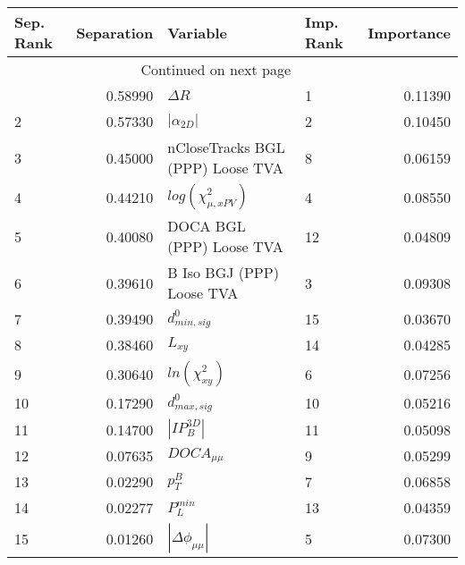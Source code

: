 \usepackage{lscape}

\begin{landscape}
\begin{longtable}{lrllr}
\toprule
Sep. Rank &  Separation &                          Variable & Imp. Rank &  Importance \\
\midrule
\endhead
\midrule
\multicolumn{3}{r}{{Continued on next page}} \\
\midrule
\endfoot

\bottomrule
\endlastfoot
        1 &     0.58990 &                        $\Delta R$ &         1 &     0.11390 \\
        2 &     0.57330 &                   $|\alpha_{2D}|$ &         2 &     0.10450 \\
        3 &     0.45000 &  nCloseTracks BGL (PPP) Loose TVA &         8 &     0.06159 \\
        4 &     0.44210 &         $log(\chi^{2}_{\mu,xPV})$ &         4 &     0.08550 \\
        5 &     0.40080 &          DOCA BGL (PPP) Loose TVA &        12 &     0.04809 \\
        6 &     0.39610 &         B Iso BGJ (PPP) Loose TVA &         3 &     0.09308 \\
        7 &     0.39490 &                  $d^0_{min, sig}$ &        15 &     0.03670 \\
        8 &     0.38460 &                          $L_{xy}$ &        14 &     0.04285 \\
        9 &     0.30640 &               $ln(\chi^{2}_{xy})$ &         6 &     0.07256 \\
       10 &     0.17290 &                  $d^0_{max, sig}$ &        10 &     0.05216 \\
       11 &     0.14700 &                   $|IP_{B}^{3D}|$ &        11 &     0.05098 \\
       12 &     0.07635 &                   $DOCA_{\mu\mu}$ &         9 &     0.05299 \\
       13 &     0.02290 &                         $p^B_{T}$ &         7 &     0.06858 \\
       14 &     0.02277 &                     $P^{min}_{L}$ &        13 &     0.04359 \\
       15 &     0.01260 &          $|\Delta \phi_{\mu\mu}|$ &         5 &     0.07300 \\
\end{longtable}

\end{landscape}
